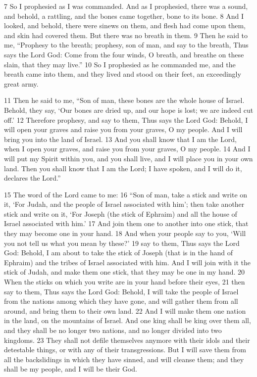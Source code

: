 \begin{bible}
7 So I prophesied as I was commanded. And as I prophesied, there was a sound, and behold, a rattling, and the bones came together, bone to its bone. 8 And I looked, and behold, there were sinews on them, and flesh had come upon them, and skin had covered them. But there was no breath in them. 9 Then he said to me, ``Prophesy to the breath; prophesy, son of man, and say to the breath, Thus says the Lord God: Come from the four winds, O breath, and breathe on these slain, that they may live.'' 10 So I prophesied as he commanded me, and the breath came into them, and they lived and stood on their feet, an exceedingly great army.

11 Then he said to me, ``Son of man, these bones are the whole house of Israel. Behold, they say, `Our bones are dried up, and our hope is lost; we are indeed cut off.' 12 Therefore prophesy, and say to them, Thus says the Lord God: Behold, I will open your graves and raise you from your graves, O my people. And I will bring you into the land of Israel. 13 And you shall know that I am the Lord, when I open your graves, and raise you from your graves, O my people. 14 And I will put my Spirit within you, and you shall live, and I will place you in your own land. Then you shall know that I am the Lord; I have spoken, and I will do it, declares the Lord.''

15 The word of the Lord came to me: 16 ``Son of man, take a stick and write on it, `For Judah, and the people of Israel associated with him'; then take another stick and write on it, `For Joseph (the stick of Ephraim) and all the house of Israel associated with him.' 17 And join them one to another into one stick, that they may become one in your hand. 18 And when your people say to you, `Will you not tell us what you mean by these?' 19 say to them, Thus says the Lord God: Behold, I am about to take the stick of Joseph (that is in the hand of Ephraim) and the tribes of Israel associated with him. And I will join with it the stick of Judah, and make them one stick, that they may be one in my hand. 20 When the sticks on which you write are in your hand before their eyes, 21 then say to them, Thus says the Lord God: Behold, I will take the people of Israel from the nations among which they have gone, and will gather them from all around, and bring them to their own land. 22 And I will make them one nation in the land, on the mountains of Israel. And one king shall be king over them all, and they shall be no longer two nations, and no longer divided into two kingdoms. 23 They shall not defile themselves anymore with their idols and their detestable things, or with any of their transgressions. But I will save them from all the backslidings in which they have sinned, and will cleanse them; and they shall be my people, and I will be their God.


\end{bible}
